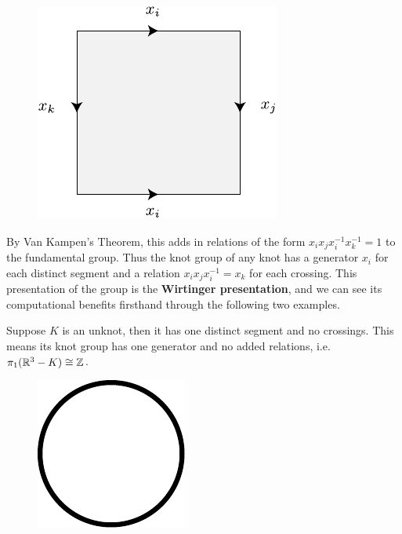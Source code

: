\documentclass[twoside,10pt]{article}
\begin{document}
\begin{figure}[H]
	\centering
	\includegraphics[scale=1]{fig/square-orient.pdf}
\end{figure}

By Van Kampen's Theorem, this adds in relations of the form $x_i x_j x_i^{-1} x_k^{-1} = 1$ to the fundamental group. Thus the knot group of any knot has a generator $x_i$ for each distinct segment and a relation $x_i x_j x_i^{-1} = x_k$ for each crossing. This presentation of the group is the \textbf{Wirtinger presentation}, and we can see its computational benefits firsthand through the following two examples.

\begin{ex}
	Suppose $K$ is an unknot, then it has one distinct segment and no crossings. This means its knot group has one generator and no added relations, i.e. $\pi_1(\mathbb{R}^{3}-K) \cong \mathbb{Z}$.

	\begin{figure}[H]
		\centering
		\includegraphics[scale=1]{fig/unknot.pdf}
	\end{figure}
\end{ex}

\newpage
\end{document}
